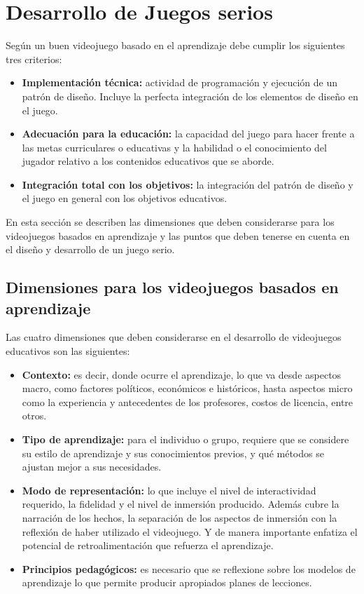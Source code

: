 \section{Desarrollo de Juegos serios} \label{sec:desarrollo}

Según \cite{education:games} un buen videojuego basado en el aprendizaje debe
cumplir  los siguientes tres criterios:

\begin{itemize}
\item \textbf{Implementación técnica:} actividad de programación y ejecución de
    un patrón de diseño. Incluye la perfecta integración de los elementos de
    diseño en el juego.
\item \textbf{Adecuación para la educación:} la capacidad del juego para hacer
    frente a las metas curriculares o educativas y la habilidad o el
    conocimiento del jugador relativo a los contenidos educativos que se aborde.
\item \textbf{Integración total con los objetivos:} la integración del patrón de
    diseño y el juego en general con los objetivos educativos.
\end{itemize}

En esta sección se describen las dimensiones que deben considerarse para los
videojuegos basados en  aprendizaje y las puntos que deben tenerse en cuenta en
el diseño y desarrollo  de un juego serio. 


\subsection{Dimensiones para los videojuegos basados en aprendizaje}

Las cuatro dimensiones que deben considerarse en el desarrollo de videojuegos
educativos son las  siguientes\cite{education:games}:

\begin{itemize}
\item \textbf{Contexto:} es decir, donde ocurre el aprendizaje, lo que va desde
    aspectos macro, como  factores políticos, económicos e históricos, hasta
    aspectos micro como la experiencia y  antecedentes de los profesores, costos
    de licencia, entre otros.
\item \textbf{Tipo de aprendizaje:} para el individuo o grupo, requiere que se
    considere su  estilo de aprendizaje y sus conocimientos previos, y qué
    métodos se ajustan mejor a sus  necesidades.
\item \textbf{Modo de representación:} lo que incluye el nivel de interactividad
    requerido, la fidelidad y  el nivel de inmersión producido. Además cubre la
    narración de los hechos, la separación de los  aspectos de inmersión con la
    reflexión de haber utilizado el videojuego. Y de manera importante  enfatiza
    el potencial de retroalimentación que refuerza el aprendizaje.
\item \textbf{Principios pedagógicos:} es necesario que se reflexione sobre los
    modelos de aprendizaje lo  que permite producir apropiados planes de
    lecciones.
\end{itemize}

